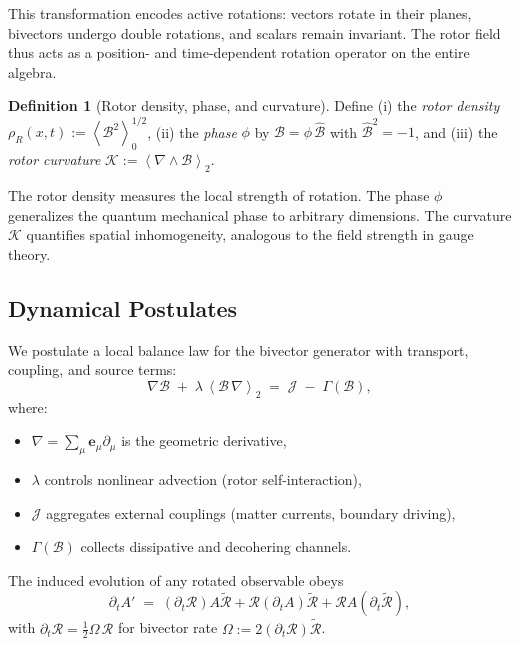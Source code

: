 \documentclass[11pt,a4paper]{article}
\newcommand{\e}{\mathbf{e}}
\newcommand{\grade}[2]{\left\langle #1 \right\rangle_{#2}}
\newcommand{\scal}[1]{\grade{#1}{0}}
\newcommand{\biv}[1]{\grade{#1}{2}}
\newcommand{\rev}[1]{\widetilde{#1}}           %
\newcommand{\Rotor}{\mathcal{R}}
\newcommand{\Biv}{\mathcal{B}}
\newcommand{\D}{\nabla}                        %
\theoremstyle{definition}
\newtheorem{definition}{Definition}
\theoremstyle{plain}
\theoremstyle{remark}
\begin{document}
This transformation encodes active rotations: vectors rotate in their planes, bivectors undergo double rotations, and scalars remain invariant. The rotor field thus acts as a position- and time-dependent rotation operator on the entire algebra.

\begin{definition}[Rotor density, phase, and curvature]
Define (i) the \emph{rotor density} $\rho_R(x,t):=\scal{\Biv^2}^{1/2}$, (ii) the \emph{phase} $\phi$ by $\Biv=\phi\,\hat{\Biv}$ with $\hat{\Biv}^2=-1$, and (iii) the \emph{rotor curvature} $\mathcal{K}:=\biv{\D \wedge \Biv}$.
\end{definition}

The rotor density measures the local strength of rotation. The phase $\phi$ generalizes the quantum mechanical phase to arbitrary dimensions. The curvature $\mathcal{K}$ quantifies spatial inhomogeneity, analogous to the field strength in gauge theory.

\subsection{Dynamical Postulates}

We postulate a local balance law for the bivector generator with transport, coupling, and source terms:
\begin{equation}
  \D \Biv \;+\; \lambda\, \biv{\Biv\,\D} \;=\; \mathcal{J} \;-\; \Gamma(\Biv),
  \label{eq:rotor-dynamics}
\end{equation}
where:
\begin{itemize}[leftmargin=*,itemsep=2pt]
  \item $\D = \sum_\mu \e_\mu \partial_\mu$ is the geometric derivative,
  \item $\lambda$ controls nonlinear advection (rotor self-interaction),
  \item $\mathcal{J}$ aggregates external couplings (matter currents, boundary driving),
  \item $\Gamma(\Biv)$ collects dissipative and decohering channels.
\end{itemize}

The induced evolution of any rotated observable obeys
\begin{equation}
  \partial_t A' \;=\; \left(\partial_t \Rotor\right) A \rev{\Rotor} + \Rotor \left(\partial_t A\right)\rev{\Rotor} + \Rotor A \left(\partial_t\rev{\Rotor}\right),
\end{equation}
with $\partial_t \Rotor = \frac{1}{2}\Omega\,\Rotor$ for bivector rate $\Omega:=2(\partial_t \Rotor)\rev{\Rotor}$.
\end{document}
